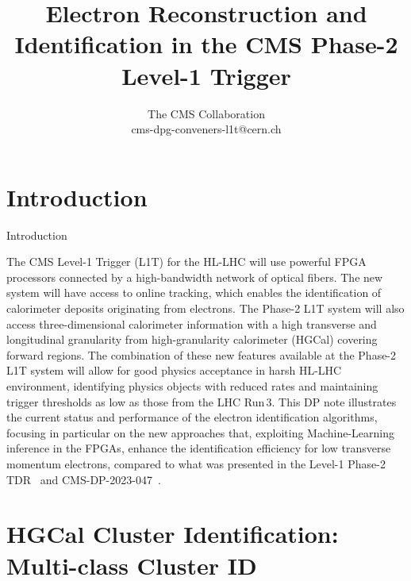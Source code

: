\documentclass[aspectratio=169]{beamer}\usepackage[utf8]{inputenc}
\author{The CMS Collaboration\\ cms-dpg-conveners-l1t@cern.ch}
\date{}
\title{Electron Reconstruction and Identification in the CMS Phase-2 Level-1 Trigger}
\begin{document}
\frame{\titlepage}


\frame{\tableofcontents}



\section{Introduction}


\begin{frame}{Introduction}

\begin{minipage}{\textwidth}

The CMS Level-1 Trigger (L1T) for the HL-LHC will use powerful FPGA processors connected by a high-bandwidth network of optical fibers. 
The new system will have access to online tracking, which enables the identification of calorimeter deposits originating from electrons. The Phase-2 L1T system will also access three-dimensional calorimeter information with a high transverse and longitudinal granularity from high-granularity calorimeter (HGCal) covering forward regions. The combination of these new features available at the Phase-2 L1T system will allow for good physics acceptance in harsh HL-LHC environment, identifying physics objects with reduced rates and maintaining trigger thresholds as low as those from the LHC Run\,3.
This DP note illustrates the current status and performance of the electron identification algorithms, focusing in particular on the new approaches that, exploiting Machine-Learning inference in the FPGAs, enhance the identification efficiency for low transverse momentum electrons, compared to what was presented in the Level-1 Phase-2 TDR~\cite{tdr-p2-l1} and CMS-DP-2023-047~\cite{tdr-p2-l1-eg}.

\end{minipage}
\end{frame}




\section{HGCal Cluster Identification: Multi-class Cluster ID}
\end{document}
